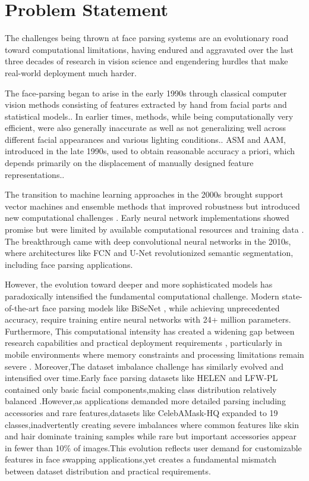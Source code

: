 \documentclass[12pt,a4paper]{report}
\begin{document}
\section{Problem Statement}

The challenges being thrown at face parsing systems are an evolutionary road toward computational limitations, having endured and aggravated over the last three decades of research in vision science and engendering hurdles that make real-world deployment much harder.

The face-parsing began to arise in the early 1990s through classical computer vision methods consisting of features extracted by hand from facial parts and statistical models.\cite{cootes1995active}. In earlier times, methods, while being computationally very efficient, were also generally inaccurate as well as not generalizing well across different facial appearances and various lighting conditions.\cite{edwards1998face}. ASM and AAM, introduced in the late 1990s, used to obtain reasonable accuracy a priori, which depends primarily on the displacement of manually designed feature representations.\cite{cootes2001active}.

The transition to machine learning approaches in the 2000s brought support vector machines and ensemble methods that improved robustness but introduced new computational challenges \cite{viola2004robust}. Early neural network implementations showed promise but were limited by available computational resources and training data \cite{rowley1998neural}. The breakthrough came with deep convolutional neural networks in the 2010s, where architectures like FCN \cite{long2015fully} and U-Net \cite{ronneberger2015unet} revolutionized semantic segmentation, including face parsing applications.

However, the evolution toward deeper and more sophisticated models has paradoxically intensified the fundamental computational challenge. Modern state-of-the-art face parsing models like BiSeNet \cite{yu2018bisenet}, while achieving unprecedented accuracy, require training entire neural networks with 24+ million parameters. Furthermore, This computational intensity has created a widening gap between research capabilities and practical deployment requirements , particularly in mobile environments where memory constraints and processing limitations remain severe \cite{sandler2018mobilenetv2} . 
Moreover,The dataset imbalance challenge has similarly evolved and intensified over time.Early face parsing datasets like HELEN \cite{le2012interactive} and LFW-PL \cite{kae2013augmenting} contained only basic facial components,making class distribution relatively balanced .However,as applications demanded more detailed parsing including accessories and rare features,datasets like CelebAMask-HQ \cite{lee2020maskgan} expanded to 19 classes,inadvertently creating severe imbalances where common features like skin and hair dominate training samples while rare but important accessories appear in fewer than 10\% of images.This evolution reflects user demand for customizable features in face swapping applications,yet creates a fundamental mismatch between dataset distribution and practical requirements\cite{liu2019towards}.
\end{document}
